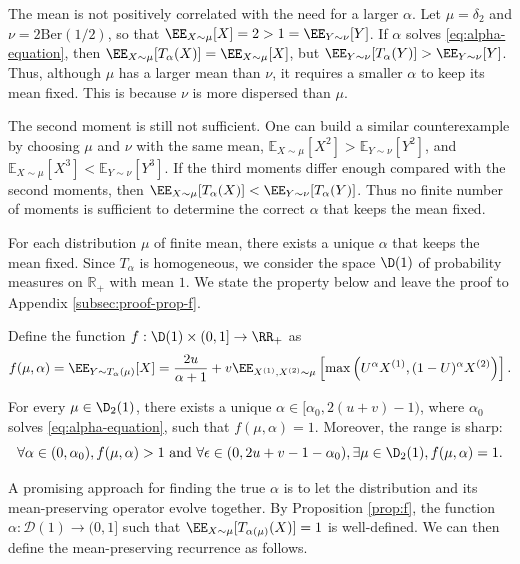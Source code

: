         The mean is not positively correlated with the need for a larger $\alpha$. Let $\mu = \delta_2$ and $\nu = 2\text{Ber}(1/2)$, so that $\EE_{X\sim\mu}[X] = 2 > 1 = \EE_{Y\sim\nu}[Y]$. If $\alpha$ solves \eqref{eq:alpha-equation}, then $\EE_{X\sim\mu}[T_\alpha(X)] = \EE_{X\sim\mu}[X]$, but $\EE_{Y\sim\nu}[T_\alpha(Y)] > \EE_{Y\sim\nu}[Y]$. Thus, although $\mu$ has a larger mean than $\nu$, it requires a smaller $\alpha$ to keep its mean fixed. This is because $\nu$ is more dispersed than $\mu$.

        The second moment is still not sufficient. One can build a similar counterexample by choosing $\mu$ and $\nu$ with the same mean, $\mathbb{E}_{X\sim\mu}[X^2] > \mathbb{E}_{Y\sim\nu}[Y^2]$, and $\mathbb{E}_{X\sim\mu}[X^3] < \mathbb{E}_{Y\sim\nu}[Y^3]$. If the third moments differ enough compared with the second moments, then $\EE_{X\sim\mu}[T_\alpha(X)] < \EE_{Y\sim\nu}[T_\alpha(Y)]$. Thus no finite number of moments is sufficient to determine the correct $\alpha$ that keeps the mean fixed.

        For each distribution $\mu$ of finite mean, there exists a unique $\alpha$ that keeps the mean fixed. Since $T_\alpha$ is homogeneous, we consider the space $\D(1)$ of probability measures on $\mathbb{R}_+$ with mean $1$. We state the property below and leave the proof to Appendix \ref{subsec:proof-prop-f}.

        \begin{proposition}
          \label{prop:f}
          Define the function $f: \D(1)\times(0,1] \to \RR_+$ as
          $$f(\mu, \alpha) = \EE_{Y\sim T_\alpha(\mu)}[X] = \dfrac{2u}{\alpha+1} + v \EE_{X^{(1)}, X^{(2)}\sim\mu}\left[\max\left(U^\alpha X^{(1)}, (1-U)^\alpha X^{(2)}\right)\right].$$

          For every $\mu\in \D_2(1)$, there exists a unique $\alpha\in[\alpha_0, 2(u+v)-1)$, where $\alpha_0$ solves \eqref{eq:alpha-equation}, such that $f(\mu, \alpha) = 1$. Moreover, the range is sharp:
          $$\forall \alpha \in (0,\alpha_0), f(\mu, \alpha) > 1 \text{ and } \forall \epsilon\in (0,2u+v-1-\alpha_0), \exists \mu\in \D_2(1), f(\mu, \alpha) = 1.$$
        \end{proposition}

        A promising approach for finding the true $\alpha$ is to let the distribution and its mean-preserving operator evolve together. By Proposition \ref{prop:f}, the function $\alpha: \mathcal{D}(1) \to (0,1]$ such that $\EE_{X\sim\mu}[T_{\alpha(\mu)}(X)] = 1$ is well-defined. We can then define the mean-preserving recurrence as follows.

